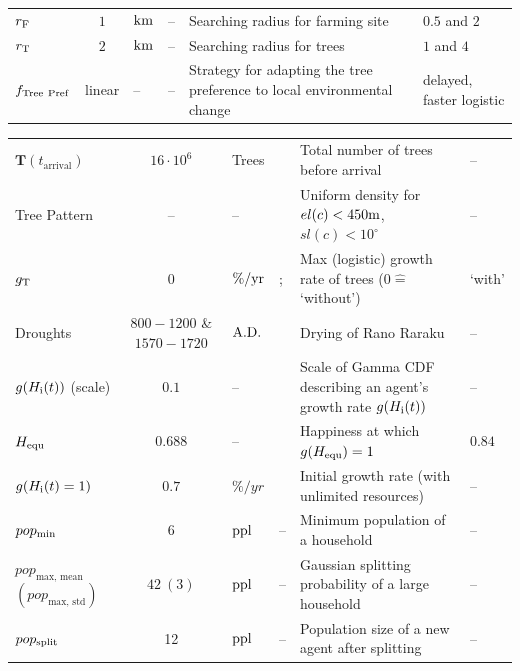 \begin{table}
\begin{tabular}{P|S|H|Q|M|P}
		   $r_{\rm F}$ & $1$ & ${\rm km}$ & -- & Searching radius for farming site &  %
		  $0.5$ and $2$\\
		  $r_{\rm T}$ & $2$ & ${\rm km}$ & -- & Searching radius for trees &  %
		  $1$ and $4$\\ \hline 
		  $f_{\rm Tree\  Pref}$ & linear & -- & --&  Strategy for adapting the tree preference to local environmental change & delayed, faster logistic \\ \hline
		\end{tabular}
  \label{tab:sensitivity}
\end{table}
\begin{threeparttable}
\centering
\begin{tabular}{P|S|H|Q|M|P}
	$\mathbf{T}(t_\text{arrival})$ & $16\cdot10^6$ & Trees & \citet{Mieth2015} & Total number of trees before arrival  &  -- \\  
	Tree Pattern & -- & -- & \citet{Bahn2017} & Uniform density for $el(c)<450{\rm m}$, $sl(c)<10^\circ$ & -- \\ \hline
	$g_{\rm T}$ & $0$ & $\%/{\rm yr}$ & \citet{Hunt2007}; \citet{Bahn2017} & Max (logistic) growth rate of trees ($0\hat{=}$`without') & `with' \\ \hline
	Droughts& $800-1200$ \& $1570-1720$ & ${\rm A.D.}$ & \citet{Rull2020} & Drying of Rano Raraku & -- \\ \hline 
	
 $g(H_{\rm i}(t))$ (scale) & $0.1$ & -- & \citet{Lee2008} & Scale of Gamma CDF describing an agent's growth rate $g(H_{\rm i}(t))$ & -- \\
 $H_{\rm equ}$  & $0.688$& -- & \citet{Puleston2017} & 
 Happiness at which $g(H_{\rm equ})=1$& $0.84$\\

 $g(H_{\rm i}(t)=1)$ & $0.7$ & $\%/yr$ & \citet{Bahn2017} & Initial growth rate (with unlimited resources) & -- \\ \hline
 		  $pop_{\rm min}$ & 6 & ${\rm ppl}$ & -- & Minimum population of a household & --\\
 $pop_\text{max, mean}$ $(pop_\text{max, std})$ & $42\ (3) $& ${\rm ppl}$ & -- & Gaussian splitting probability of a large household & --\\
 $pop_{\rm split}$ & 12 & ${\rm ppl}$ & -- & Population size of a new agent after splitting & --\\ \hline
 

\end{tabular}
\end{threeparttable}

